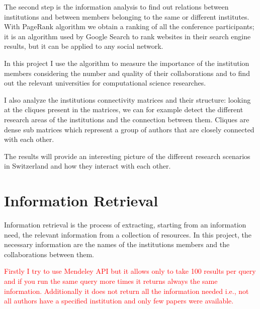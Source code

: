\documentclass[]{usiinfbachelorproject}
\begin{document}
The second step is the information analysis to find out relations between institutions and between members belonging to the same or different institutes. With PageRank algorithm we obtain a ranking of all the conference participants; it is an algorithm used by Google Search to rank websites in their search engine results, but it can be applied to any social network. 

In this project I use the algorithm to measure the importance of the institution members considering the number and quality of their collaborations and to find out the relevant universities for computational science researches. 


I also analyze the institutions connectivity matrices and their structure: looking at the cliques present in the matrices, we can for example detect the different research areas of the institutions and the connection between them. Cliques are dense sub matrices which represent a group of authors that are closely connected with each other. 

The results will provide an interesting picture of the different research scenarios in Switzerland and how they interact with each other.






\section{Information Retrieval} \label{sec:inforetrieval} 

Information retrieval is the process of extracting, starting from an information need, the relevant information from a collection of resources. In this project, the necessary information are the names of the institutions members and the collaborations between them. 

\textcolor{red}{Firstly I try to use Mendeley API but it allows only to take 100 results per query and if you run the same query more times it returns always the same information. Additionally it does not return all the information needed i.e., not all authors have a specified institution and only few papers were available.}
\end{document}
